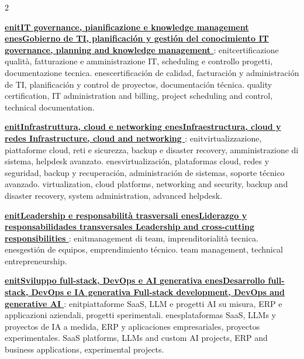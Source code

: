 \documentclass[10pt,a4paper,ragged2e,withhyper]{altacv}
\providecommand{\CVlanguage}{en}
\def\CVlangIT{it}
\def\CVlangES{es}
\newcommand{\cvtext}[3]{%
  \ifx\CVlanguage\CVlangIT #1\else
  \ifx\CVlanguage\CVlangES #2\else
  #3\fi\fi
}
\newenvironment{cveventblock}{%
  \begingroup
    \footnotesize
    \setlist[itemize]{topsep=2pt, itemsep=1pt, left=0.5em}
}{%
  \endgroup
}
\begin{document}
\begin{paracol}{2}
\begin{cveventblock}
{
    \footnotesize
\noindent
\textbf{\href{https://alesop95.github.io/skills/technical/management/project-planning-scheduling/}{\cvtext{IT governance, pianificazione e knowledge management}{Gobierno de TI, planificación y gestión del conocimiento}{IT governance, planning and knowledge management}}}: \cvtext{certificazione qualità, fatturazione e amministrazione IT, scheduling e controllo progetti, documentazione tecnica.}{certificación de calidad, facturación y administración de TI, planificación y control de proyectos, documentación técnica.}{quality certification, IT administration and billing, project scheduling and control, technical documentation.}
\textbf{\href{https://alesop95.github.io/skills/technical/infrastructure/infrastructure-virtualization/}{\cvtext{Infrastruttura, cloud e networking}{Infraestructura, cloud y redes}{Infrastructure, cloud and networking}}}: \cvtext{virtualizzazione, piattaforme cloud, reti e sicurezza, backup e disaster recovery, amministrazione di sistema, helpdesk avanzato.}{virtualización, plataformas cloud, redes y seguridad, backup y recuperación, administración de sistemas, soporte técnico avanzado.}{virtualization, cloud platforms, networking and security, backup and disaster recovery, system administration, advanced helpdesk.}
\textbf{\href{https://alesop95.github.io/skills/technical/management/leadership-management/}{\cvtext{Leadership e responsabilità trasversali}{Liderazgo y responsabilidades transversales}{Leadership and cross-cutting responsibilities}}}: \cvtext{management di team, imprenditorialità tecnica.}{gestión de equipos, emprendimiento técnico.}{team management, technical entrepreneurship.}
\textbf{\href{https://alesop95.github.io/skills/technical/software-engineering/fullstack-development-devops/}{\cvtext{Sviluppo full-stack, DevOps e AI generativa}{Desarrollo full-stack, DevOps e IA generativa}{Full-stack development, DevOps and generative AI}}}: \cvtext{piattaforme SaaS, LLM e progetti AI su misura, ERP e applicazioni aziendali, progetti sperimentali.}{plataformas SaaS, LLMs y proyectos de IA a medida, ERP y aplicaciones empresariales, proyectos experimentales.}{SaaS platforms, LLMs and custom AI projects, ERP and business applications, experimental projects.}
}
\end{cveventblock}
\end{paracol}
\end{document}
